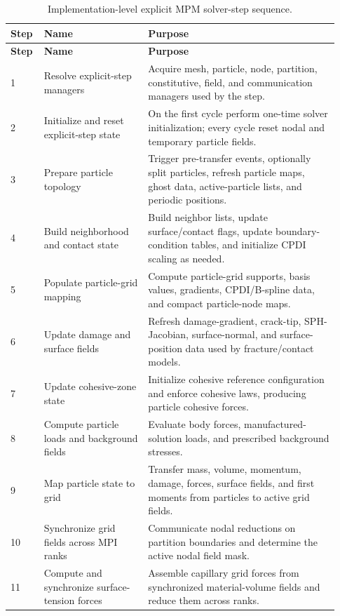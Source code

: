 \begin{longtable}{@{}p{0.08\linewidth}p{0.30\linewidth}p{0.55\linewidth}@{}}
\caption{Implementation-level explicit MPM solver-step sequence.}\label{tab:solver-steps}\\
\toprule
\textbf{Step} & \textbf{Name} & \textbf{Purpose}\\
\midrule
\endfirsthead
\toprule
\textbf{Step} & \textbf{Name} & \textbf{Purpose}\\
\midrule
\endhead
1 & Resolve explicit-step managers & Acquire mesh, particle, node, partition, constitutive, field, and communication managers used by the step.\\
2 & Initialize and reset explicit-step state & On the first cycle perform one-time solver initialization; every cycle reset nodal and temporary particle fields.\\
3 & Prepare particle topology & Trigger pre-transfer events, optionally split particles, refresh particle maps, ghost data, active-particle lists, and periodic positions.\\
4 & Build neighborhood and contact state & Build neighbor lists, update surface/contact flags, update boundary-condition tables, and initialize CPDI scaling as needed.\\
5 & Populate particle-grid mapping & Compute particle-grid supports, basis values, gradients, CPDI/B-spline data, and compact particle-node maps.\\
6 & Update damage and surface fields & Refresh damage-gradient, crack-tip, SPH-Jacobian, surface-normal, and surface-position data used by fracture/contact models.\\
7 & Update cohesive-zone state & Initialize cohesive reference configuration and enforce cohesive laws, producing particle cohesive forces.\\
8 & Compute particle loads and background fields & Evaluate body forces, manufactured-solution loads, and prescribed background stresses.\\
9 & Map particle state to grid & Transfer mass, volume, momentum, damage, forces, surface fields, and first moments from particles to active grid fields.\\
10 & Synchronize grid fields across MPI ranks & Communicate nodal reductions on partition boundaries and determine the active nodal field mask.\\
11 & Compute and synchronize surface-tension forces & Assemble capillary grid forces from synchronized material-volume fields and reduce them across ranks.\\

\end{longtable}

